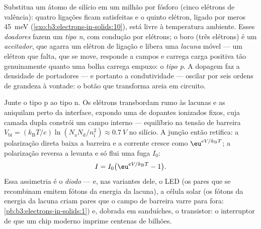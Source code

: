 \begin{definition}[Dopagem]\label{def:b3:electrons-in-solids:doping}
Substitua um átomo de silício em um milhão por fósforo (cinco elétrons
de valência): quatro ligações ficam satisfeitas e o quinto elétron,
ligado por meros \qty{45}{meV}
(\cref{exo:b3:electrons-in-solids:10}), está livre à temperatura
ambiente. Esses \emph{doadores} fazem um 
\emph{tipo n}, com condução por elétrons; o boro (três elétrons)
é um \emph{aceitador}, que agarra um elétron de ligação e libera uma
\emph{lacuna} móvel --- um elétron que falta, que se move, responde a
campos e carrega carga positiva tão genuinamente quanto uma bolha
carrega empuxo: o \emph{tipo p}. A dopagem faz a densidade de portadores
--- e portanto a condutividade --- oscilar por seis ordens de grandeza à
vontade: o botão que transforma areia em circuito.
\end{definition}

\begin{proposition}[A junção p--n]\label{prop:b3:electrons-in-solids:junction}
Junte o tipo p ao tipo n. Os elétrons transbordam rumo às lacunas e
as aniquilam perto da interface, expondo uma \emph{} de dopantes ionizados fixos, cuja camada dupla constrói um
campo interno --- equilíbrio na tensão de barreira
$V_{\text{bi}} = (k_{\text{B}}T/e)
\ln(N_{\text{a}}N_{\text{d}}/n_{\text{i}}^2) \approx
\qty{0.7}{V}$ no silício. A junção então retifica: a
polarização direta baixa a barreira e a corrente cresce como
$\eu^{eV/k_{\text{B}}T}$; a polarização reversa a levanta e só flui uma
fuga $I_0$:
\[
I = I_0\big(\eu^{eV/k_{\text{B}}T} - 1\big) .
\]
Essa assimetria é o \emph{diodo} --- e, nas variantes dele, o
LED (os pares que se recombinam emitem fótons da energia da lacuna), a
célula solar (os fótons da energia da lacuna criam pares que o campo
de barreira varre para fora: \cref{pb:b3:electrons-in-solids:1}) e,
dobrada em sanduíches, o transistor: o interruptor de que um chip
moderno imprime centenas de bilhões.
\end{proposition}
\admitted

